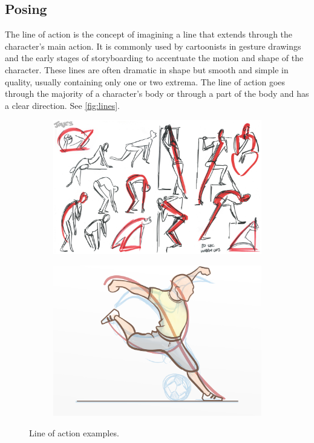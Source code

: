 \subsection{Posing}
The line of action is the concept of imagining a line that extends through the character's main action. It is commonly used by cartoonists in gesture drawings and the early stages of storyboarding to accentuate the motion and shape of the character. These lines are often dramatic in shape but smooth and simple in quality, usually containing only one or two extrema. The line of action goes through the majority of a character's body or through a part of the body and has a clear direction. See \autoref{fig:lines}.

\begin{figure}[h!]
	\centering
        \begin{subfigure}[b!]{0.45\textwidth}
        	\centering
                \includegraphics[width=\linewidth]{img/cartoon}
                \label{fig:gesture}
        \end{subfigure}
        \quad
        \begin{subfigure}[b!]{0.45\textwidth}
        	\centering
                \includegraphics[width=\linewidth]{img/kick}
                \label{fig:kick}
        \end{subfigure}%
        \caption{Line of action examples.}
	\label{fig:lines}
\end{figure}

